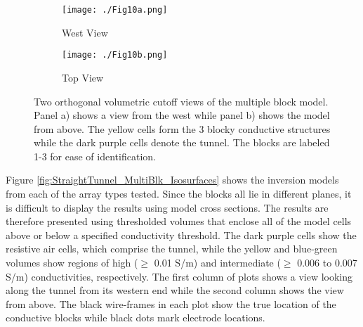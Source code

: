 \documentclass[preprint,authoryear,12pt]{elsarticle}
\begin{document}
\begin{figure}[htp]{}
   \begin{center}
      \begin{subfigure}{0.54\linewidth}
         \texttt{[image: ./Fig10a.png]}
         \caption{West View}
         \label{fig:StraightTunnel_MultiBlk_TrueMod_West}
      \end{subfigure}
      \hspace{-2.5cm}
      \qquad
      \begin{subfigure}{0.54\linewidth}
         \texttt{[image: ./Fig10b.png]}
         \caption{Top View}
         \label{fig:StraightTunnel_MultiBlk_TrueMod_Top}
      \end{subfigure}
   \end{center}
\vspace{-0.4cm}
\caption{Two orthogonal volumetric cutoff views of the multiple block model. Panel a) shows a view from the west while panel b) shows the model from above. The yellow cells form the 3 blocky conductive structures while the dark purple cells denote the tunnel. The blocks are labeled 1-3 for ease of identification.}
\label{fig:StraightTunnel_MultiBlk_TrueMod}
\end{figure}


Figure \ref{fig:StraightTunnel_MultiBlk_Isosurfaces} shows the inversion models from each of the array types tested. Since the blocks all lie in different planes, it is difficult to display the results using model cross sections. The results are therefore presented using thresholded volumes that enclose all of the model cells above or below a specified conductivity threshold. The dark purple cells show the resistive air cells, which comprise the tunnel, while the yellow and blue-green volumes show regions of high ($\geq$ 0.01 S/m) and intermediate ($\geq$ 0.006 to 0.007 S/m) conductivities, respectively. The first column of plots shows a view looking along the tunnel from its western end while the second column shows the view from above. The black wire-frames in each plot show the true location of the conductive blocks while black dots mark electrode locations.
\end{document}
